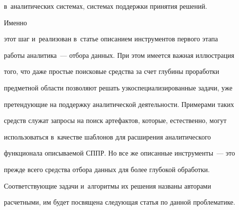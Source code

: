 в~аналитических системах, системах поддержки принятия решений. 







Именно 


этот шаг и~реализован в~статье описанием инструментов первого этапа 


работы аналитика~--- отбора данных. При этом имеется важная иллюстрация 


того, что даже простые поисковые средства за счет глубины проработки 


предметной области позволяют решать узкоспециализированные задачи, уже 


претендующие на поддержку аналитической деятельности. Примерами таких 


средств служат запросы на поиск артефактов, которые, естественно, могут 


использоваться в~качестве шаблонов для расширения аналитического 


функционала описываемой СППР. Но все же описанные инструменты~--- это 


прежде всего средства отбора данных для более глубокой обработки. 





%


Соответствующие задачи и~алгоритмы их решения названы авторами 


расчетными, им будет посвящена следующая статья по данной проблематике.


      


